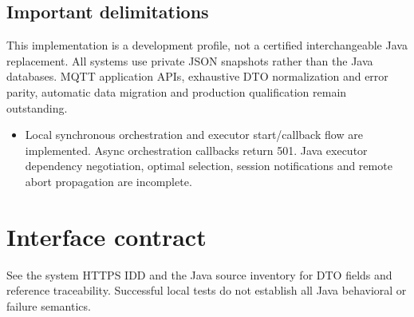 \documentclass[a4paper]{arrowhead}
\begin{document}
\subsection{Important delimitations}
This implementation is a development profile, not a certified interchangeable Java replacement. All systems use private JSON snapshots rather than the Java databases. MQTT application APIs, exhaustive DTO normalization and error parity, automatic data migration and production qualification remain outstanding.
\begin{itemize}
\item Local synchronous orchestration and executor start/callback flow are implemented. Async orchestration callbacks return 501. Java executor dependency negotiation, optimal selection, session notifications and remote abort propagation are incomplete.
\end{itemize}
\section{Interface contract}
See the system HTTPS IDD and the Java source inventory for DTO fields and reference traceability. Successful local tests do not establish all Java behavioral or failure semantics.
\end{document}
